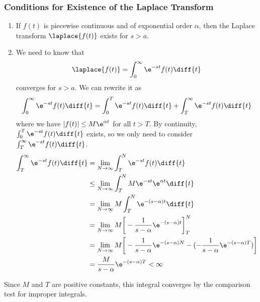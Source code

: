 \documentclass{math}
\begin{document}
\subsubsection*{Conditions for Existence of the Laplace Transform}
\begin{enumerate}
  \item If \( f(t) \) is piecewise continuous and of exponential order
  \( \alpha \), then the Laplace transform \( \laplace{f(t)} \) exists for
  \( s>a \).
  \item We need to know that
  \[ \laplace{f(t)} = \int_{0}^{\infty}\e^{-st}f(t)\diff{t} \]
  converges for \( s>a \). We can rewrite it as
  \[ \int_{0}^{\infty}\e^{-st}f(t)\diff{t} = \int_{0}^{T}\e^{-st}f(t)\diff{t}+
    \int_{T}^{\infty}\e^{-st}f(t)\diff{t} \]
  where we have \( |f(t)|\le M\e^{\alpha t} \) for all \( t > T \). By
  continuity, \( \int_{0}^{T}\e^{-st}f(t)\diff{t} \) exists, so we only need to
  consider \( \int_{T}^{\infty}\e^{-st}f(t)\diff{t} \).
  \begin{align*}
    \int_{T}^{\infty}\e^{-st}f(t)\diff{t} &=
      \lim_{N\to\infty}\int_{T}^{N}\e^{-st}f(t)\diff{t} \\
    &\le \lim_{N\to\infty}\int_{T}^{N}M\e^{-st}\e^{\alpha t}\diff{t} \\
    &= \lim_{N\to\infty}M\int_{T}^{N}\e^{-(s-\alpha)t}\diff{t} \\
    &= \lim_{N\to\infty}M\bigg[
      -\frac{1}{s-\alpha}\e^{-(s-\alpha)t}\bigg]_{T}^{N} \\
    &= \lim_{N\to\infty}M\bigg[-\frac{1}{s-\alpha}\e^{-(s-\alpha)N}-
      (-\frac{1}{s-\alpha}\e^{-(s-\alpha)T})\bigg] \\
    &= \frac{M}{s-\alpha}\e^{-(s-\alpha)T} < \infty
  \end{align*}
\end{enumerate}
Since \( M \) and \( T \) are positive constants, this integral converges by
the comparison test for improper integrals.
\end{document}

